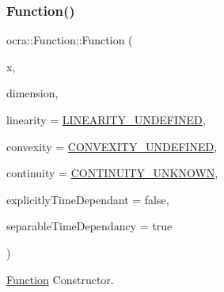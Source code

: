 \subsubsection{\texorpdfstring{Function()}{Function()}}
{\footnotesize\ttfamily ocra\+::\+Function\+::\+Function (\begin{DoxyParamCaption}\item[{\hyperlink{classocra_1_1Variable}{Variable} \&}]{x,  }\item[{int}]{dimension,  }\item[{\hyperlink{namespaceocra_a87b525b5508b0f6e9d931f14c7c226ab}{e\+Function\+Linearity}}]{linearity = {\ttfamily \hyperlink{namespaceocra_a87b525b5508b0f6e9d931f14c7c226abadd86a2dd3240e6df49a6e422b5abe075}{L\+I\+N\+E\+A\+R\+I\+T\+Y\+\_\+\+U\+N\+D\+E\+F\+I\+N\+ED}},  }\item[{\hyperlink{namespaceocra_ae6e8dca6121e9618486a449754876119}{e\+Function\+Convexity}}]{convexity = {\ttfamily \hyperlink{namespaceocra_ae6e8dca6121e9618486a449754876119a40aab88792841afe151808f879cfaa99}{C\+O\+N\+V\+E\+X\+I\+T\+Y\+\_\+\+U\+N\+D\+E\+F\+I\+N\+ED}},  }\item[{int}]{continuity = {\ttfamily \hyperlink{namespaceocra_ae5102ad1959d0c0dbf2eaa5610bbf728ad66557aadcf8856f9f135ff26db1a862}{C\+O\+N\+T\+I\+N\+U\+I\+T\+Y\+\_\+\+U\+N\+K\+N\+O\+WN}},  }\item[{bool}]{explicitly\+Time\+Dependant = {\ttfamily false},  }\item[{bool}]{separable\+Time\+Dependancy = {\ttfamily true} }\end{DoxyParamCaption})\hspace{0.3cm}{\ttfamily [protected]}}



\hyperlink{classocra_1_1Function}{Function} Constructor. 


